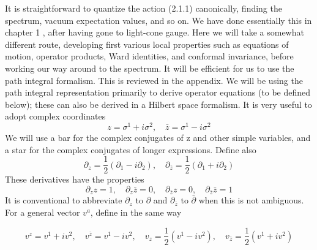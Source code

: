 It is straightforward to quantize the action (2.1.1) canonically, finding the spectrum, vacuum expectation values, and so on. We have done essentially this in chapter 1 , after having gone to light-cone gauge. Here we will take a somewhat different route, developing first various local properties such
as equations of motion, operator products, Ward identities, and conformal
invariance, before working our way around to the spectrum. It will be
efficient for us to use the path integral formalism. This is reviewed in the
appendix. We will be using the path integral representation primarily to
derive operator equations (to be defined below); these can also be derived
in a Hilbert space formalism.
It is very useful to adopt complex coordinates
\begin{equation}
z=\sigma^{1}+i \sigma^{2}, \quad \bar{z}=\sigma^{1}-i \sigma^{2}
\end{equation}
We will use a bar for the complex conjugates of z and other simple
variables, and a star for the complex conjugates of longer expressions.
Define also
\begin{equation}
\partial_{z}=\frac{1}{2}\left(\partial_{1}-i \partial_{2}\right), \quad \partial_{\bar{z}}=\frac{1}{2}\left(\partial_{1}+i \partial_{2}\right)
\end{equation}
These derivatives have the properties
\begin{equation}
\partial_{z} z=1, \quad \partial_{z} \bar{z}=0, \quad \partial_{\bar{z}} z=0, \quad \partial_{\bar{z}} \bar{z}=1
\end{equation}
It is conventional to abbreviate $\partial_{z}$ to $\partial$ and $\partial_{\bar{z}}$ to $\bar{\partial}$ when this is not ambiguous. For a general vector $v^{a}$, define in the same way

\begin{equation}
v^{z}=v^{1}+i v^{2}, \quad v^{\bar{z}}=v^{1}-i v^{2}, \quad v_{z}=\frac{1}{2}\left(v^{1}-i v^{2}\right), \quad v_{\bar{z}}=\frac{1}{2}\left(v^{1}+i v^{2}\right)
\end{equation}

